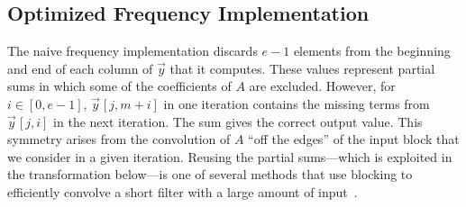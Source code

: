 \subsection{Optimized Frequency Implementation}

The naive frequency implementation discards $e-1$ elements from the
beginning and end of each column of ${\vec y}$ that it computes.  These
values represent partial sums in which some of the coefficients of $A$
are excluded. However, for $i \in [0, e-1]$, ${\vec y}\hspace{1pt}[j,m+i]$ 
in one iteration contains the missing terms from ${\vec y}\hspace{1pt}[j,i]$
in the next iteration. The sum gives the correct output value.
This symmetry arises from the convolution of $A$ ``off the edges'' of
the input block that we consider in a given iteration. Reusing the partial
sums---which is exploited in the transformation below---is one of
several methods that use blocking to efficiently convolve a short
filter with a large amount of input~\cite{oppenheim-discrete}.

